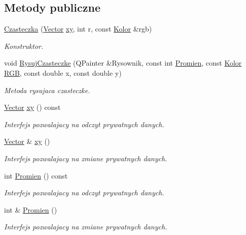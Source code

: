 \subsection*{Metody publiczne}
\begin{DoxyCompactItemize}
\item 
\hyperlink{class_czasteczka_a1e73beeb1253fbb91788eabd65bcb0bf}{Czasteczka} (\hyperlink{class_vector}{Vector} \hyperlink{class_czasteczka_a2568977045d9bfe26054029c7657ad17}{xy}, int r, const \hyperlink{class_kolor}{Kolor} \&rgb)
\begin{DoxyCompactList}\small\item\em Konstruktor. \end{DoxyCompactList}\item 
void \hyperlink{class_czasteczka_a3d143798d7b407fe9dff7b61ab2b8071}{Rysuj\+Czasteczke} (Q\+Painter \&Rysownik, const int \hyperlink{class_czasteczka_a1b550be0425165a213fa1cec985b5478}{Promien}, const \hyperlink{class_kolor}{Kolor} \hyperlink{class_czasteczka_a546104013fe302440214f8809d7ec602}{R\+G\+B}, const double x, const double y)
\begin{DoxyCompactList}\small\item\em Metoda rysujaca czasteczke. \end{DoxyCompactList}\item 
\hyperlink{class_vector}{Vector} \hyperlink{class_czasteczka_a2568977045d9bfe26054029c7657ad17}{xy} () const 
\begin{DoxyCompactList}\small\item\em Interfejs pozwalajacy na odczyt prywatnych danych. \end{DoxyCompactList}\item 
\hyperlink{class_vector}{Vector} \& \hyperlink{class_czasteczka_a103b1c45bfeb9d5fec4acf74cd9d53f0}{xy} ()
\begin{DoxyCompactList}\small\item\em Interfejs pozwalajacy na zmiane prywatnych danych. \end{DoxyCompactList}\item 
int \hyperlink{class_czasteczka_a1b550be0425165a213fa1cec985b5478}{Promien} () const 
\begin{DoxyCompactList}\small\item\em Interfejs pozwalajacy na odczyt prywatnych danych. \end{DoxyCompactList}\item 
int \& \hyperlink{class_czasteczka_abd36efdd1f58cdf8a6a8379bfe663f3b}{Promien} ()
\begin{DoxyCompactList}\small\item\em Interfejs pozwalajacy na zmiane prywatnych danych. \end{DoxyCompactList}\item 

\end{DoxyCompactItemize}
